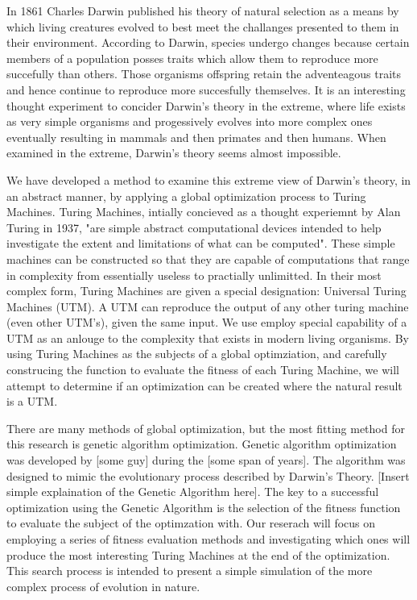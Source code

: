 In 1861 Charles Darwin published his theory of natural selection as a means by which living creatures evolved to best meet the challanges presented to them in their environment. \cite{Origin_of_species} According to Darwin, species undergo changes because certain members of a population posses traits which allow them to reproduce more succefully than others. Those organisms offspring retain the adventeagous traits and hence continue to reproduce more succesfully themselves. It is an interesting thought experiment to concider Darwin's theory in the extreme, where life exists as very simple organisms and progessively evolves into more complex ones eventually resulting in mammals and then primates and then humans. When examined in the extreme, Darwin's theory seems almost impossible. 

We have developed a method to examine this extreme view of Darwin's theory, in an abstract manner, by applying a global optimization process to Turing Machines. Turing Machines, intially concieved as a thought experiemnt by Alan Turing in 1937, "are simple abstract computational devices intended to help investigate the extent and limitations of what can be computed". \cite{SEP_turing} These simple machines can be constructed so that they are capable of computations that range in complexity from essentially useless to practially unlimitted. In their most complex form, Turing Machines are given a special designation: Universal Turing Machines (UTM). A UTM can reproduce the output of any other turing machine (even other UTM's), given the same input. We use employ special capability of a UTM as an anlouge to the complexity that exists in modern living organisms. By using Turing Machines as the subjects of a global optimziation, and carefully construcing the function to evaluate the fitness of each Turing Machine, we will attempt to determine if an optimization can be created where the natural result is a UTM. 

There are many methods of global optimization, but the most fitting method for this research is genetic algorithm optimization. Genetic algorithm optimization was developed by [some guy] during the [some span of years]. The algorithm was designed to mimic the evolutionary process described by Darwin's Theory. [Insert simple explaination of the Genetic Algorithm here]. The key to a successful optimization using the Genetic Algorithm is the selection of the fitness function to evaluate the subject of the optimzation with. Our reserach will focus on employing a series of fitness evaluation methods and investigating which ones will produce the most interesting Turing Machines at the end of the optimization. This search process is intended to present a simple simulation of the more complex process of evolution in nature.